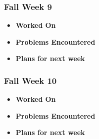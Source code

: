 \documentclass[compsoc,draftclsnofoot,onecolumn,10pt]{IEEEtran}
\begin{document}
\subsubsection{Fall Week 9}
\begin{itemize}
    \item {\textbf{Worked On}}
    \begin{itemize}
        
    \end{itemize}

    \item {\textbf{Problems Encountered}}
    \begin{itemize}
        
    \end{itemize}

    \item{\textbf{Plans for next week}}
    \begin{itemize}
        
    \end{itemize}

\end{itemize}

\subsubsection{Fall Week 10}
\begin{itemize}
    \item {\textbf{Worked On}}
    \begin{itemize}
        
    \end{itemize}

    \item {\textbf{Problems Encountered}}
    \begin{itemize}
        
    \end{itemize}

    \item{\textbf{Plans for next week}}
    \begin{itemize}
        
    \end{itemize}

\end{itemize}
\end{document}
